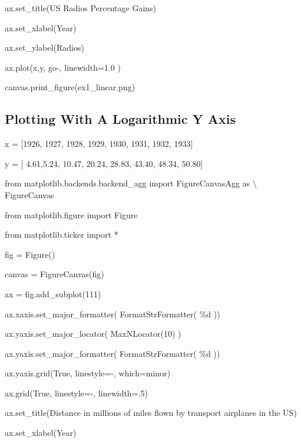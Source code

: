 \documentclass[12pt,twoside]{book}
\begin{document}
ax.set\_title({\textquotesingle}US Radios Percentage
Gains{\textquotesingle})

ax.set\_xlabel({\textquotesingle}Year{\textquotesingle})

ax.set\_ylabel({\textquotesingle}Radios{\textquotesingle})

ax.plot(x,y, {\textquotesingle}go{}-{\textquotesingle}, linewidth=1.0 )

canvas.print\_figure({\textquotesingle}ex1\_linear.png{\textquotesingle})

{\textbar}


\bigskip

\subsection[Plotting With A Logarithmic Y Axis]{ Plotting With A Logarithmic Y Axis}

\bigskip

x = [1926, 1927, 1928, 1929, 1930, 1931, 1932, 1933]

y = [ 4.61,5.24, 10.47, 20.24, 28.83, 43.40, 48.34, 50.80]


\bigskip

from matplotlib.backends.backend\_agg import FigureCanvasAgg as
{\textbackslash} FigureCanvas

from matplotlib.figure import Figure

from matplotlib.ticker import *

fig = Figure()

canvas = FigureCanvas(fig)

ax = fig.add\_subplot(111)

ax.xaxis.set\_major\_formatter( FormatStrFormatter(
{\textquotesingle}\%d{\textquotesingle} ))

ax.yaxis.set\_major\_locator( MaxNLocator(10) )

ax.yaxis.set\_major\_formatter( FormatStrFormatter(
{\textquotesingle}\%d{\textquotesingle} ))

ax.yaxis.grid(True, linestyle={\textquotesingle}{}-{\textquotesingle},
which={\textquotesingle}minor{\textquotesingle})

ax.grid(True, linestyle={\textquotesingle}{}-{\textquotesingle},
linewidth=.5)

ax.set\_title({\textquotesingle}Distance in millions of miles flown by
transport airplanes in the US{\textquotesingle})

ax.set\_xlabel({\textquotesingle}Year{\textquotesingle})
\end{document}
